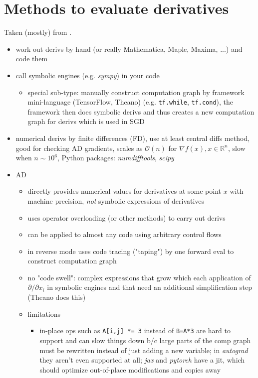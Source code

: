\documentclass[paper=a4,11pt,headsepline]{scrartcl}
\newcommand{\ve}[1]{\ensuremath{\bm{\mathit{#1}}}}
\newcommand{\soft}[1]{\textsl{#1}\xspace}
\newcommand{\pytorch}{\soft{pytorch}}
\newcommand{\jax}{\soft{jax}}
\newcommand{\autograd}{\soft{autograd}}
\newcommand{\scipy}{\soft{scipy}}
\newcommand{\numdifftools}{\soft{numdifftools}}
\newcommand{\co}[1]{\texttt{#1}}
\begin{document}
\section{Methods to evaluate derivatives}
%
Taken (mostly) from \cite{baydin_2018}.

\begin{itemize}
    \item work out derivs by hand (or really Mathematica, Maple, Maxima, ...)
        and code them
    \item call symbolic engines (e.g. \soft{sympy}) in your code
    \begin{itemize}
        \item special sub-type: manually construct computation graph by
            framework mini-language (TensorFlow, Theano) (e.g. \co{tf.while},
            \co{tf.cond}), the framework then does symbolic derivs and thus
            creates a new computation graph for derivs which is used in SGD
    \end{itemize}
\item numerical derivs by finite differences (FD), use at least central diffs method,
    good for checking AD gradients, scales as $\mathcal
    O(n)$ for $\nabla f(\ve x), \ve x\in\mathbb R^n$, slow when $n\sim 10^6$,
    Python packages: \numdifftools, \scipy
\item AD
    \begin{itemize}
        \item directly provides numerical values for derivatives at some point
            $\ve x$ with machine precision, \emph{not} symbolic expressions of
            derivatives
        \item uses operator overloading (or other methods) to carry out derivs
        \item can be applied to almost any code using arbitrary control flows
        \item in reverse mode uses code tracing ("taping") by one forward eval
            to construct computation graph
        \item no "code swell": complex expressions that grow which each
            application of $\partial/\partial x_i$ in symbolic engines and that
            need an additional simplification step (Theano does this)
        \item limitations
        \begin{itemize}
            \item in-place ops such as \co{A[i,j] *= 3} instead of
                \co{B=A*3} are hard to support and can slow things down b/c
                large parts of the comp graph must be rewritten instead of just
                adding a new variable; in \autograd they aren't even
                supported at all; \jax and \pytorch have a jit,
                which should optimize out-of-place modifications and copies
                away
        \end{itemize}
    \end{itemize}
\end{itemize}
%
\end{document}
